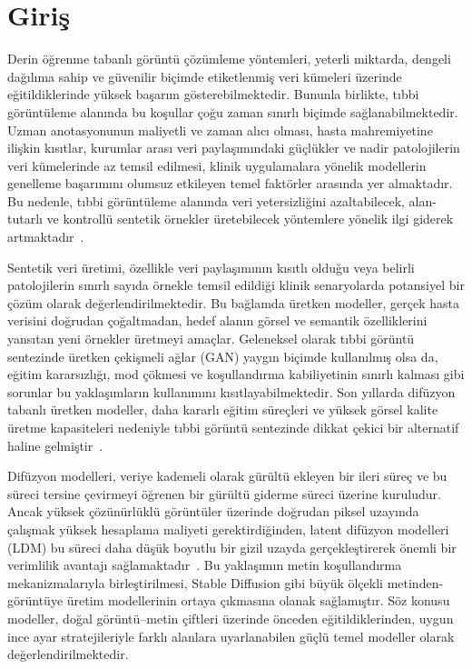 \documentclass[11pt]{article}
\begin{document}
\section{Giriş}

Derin öğrenme tabanlı görüntü çözümleme yöntemleri, yeterli miktarda, dengeli
dağılıma sahip ve güvenilir biçimde etiketlenmiş veri kümeleri üzerinde
eğitildiklerinde yüksek başarım gösterebilmektedir. Bununla birlikte, tıbbi
görüntüleme alanında bu koşullar çoğu zaman sınırlı biçimde sağlanabilmektedir.
Uzman anotasyonunun maliyetli ve zaman alıcı olması, hasta mahremiyetine ilişkin
kısıtlar, kurumlar arası veri paylaşımındaki güçlükler ve nadir patolojilerin
veri kümelerinde az temsil edilmesi, klinik uygulamalara yönelik modellerin
genelleme başarımını olumsuz etkileyen temel faktörler arasında yer almaktadır.
Bu nedenle, tıbbi görüntüleme alanında veri yetersizliğini azaltabilecek,
alan-tutarlı ve kontrollü sentetik örnekler üretebilecek yöntemlere yönelik
ilgi giderek artmaktadır~\cite{roentgen,mimic}.

Sentetik veri üretimi, özellikle veri paylaşımının kısıtlı olduğu veya belirli
patolojilerin sınırlı sayıda örnekle temsil edildiği klinik senaryolarda
potansiyel bir çözüm olarak değerlendirilmektedir. Bu bağlamda üretken modeller,
gerçek hasta verisini doğrudan çoğaltmadan, hedef alanın görsel ve semantik
özelliklerini yansıtan yeni örnekler üretmeyi amaçlar. Geleneksel olarak tıbbi
görüntü sentezinde üretken çekişmeli ağlar (GAN) yaygın biçimde kullanılmış
olsa da, eğitim kararsızlığı, mod çökmesi ve koşullandırma kabiliyetinin sınırlı
kalması gibi sorunlar bu yaklaşımların kullanımını kısıtlayabilmektedir. Son
yıllarda difüzyon tabanlı üretken modeller, daha kararlı eğitim süreçleri ve
yüksek görsel kalite üretme kapasiteleri nedeniyle tıbbi görüntü sentezinde
dikkat çekici bir alternatif haline gelmiştir~\cite{ddpm,medfusion}.

Difüzyon modelleri, veriye kademeli olarak gürültü ekleyen bir ileri süreç ve
bu süreci tersine çevirmeyi öğrenen bir gürültü giderme süreci üzerine kuruludur.
Ancak yüksek çözünürlüklü görüntüler üzerinde doğrudan piksel uzayında çalışmak
yüksek hesaplama maliyeti gerektirdiğinden, latent difüzyon modelleri (LDM)
bu süreci daha düşük boyutlu bir gizil uzayda gerçekleştirerek önemli bir
verimlilik avantajı sağlamaktadır~\cite{ldm}. Bu yaklaşımın metin koşullandırma
mekanizmalarıyla birleştirilmesi, Stable Diffusion gibi büyük ölçekli
metinden-görüntüye üretim modellerinin ortaya çıkmasına olanak sağlamıştır.
Söz konusu modeller, doğal görüntü--metin çiftleri üzerinde önceden
eğitildiklerinden, uygun ince ayar stratejileriyle farklı alanlara
uyarlanabilen güçlü temel modeller olarak değerlendirilmektedir.
\end{document}
